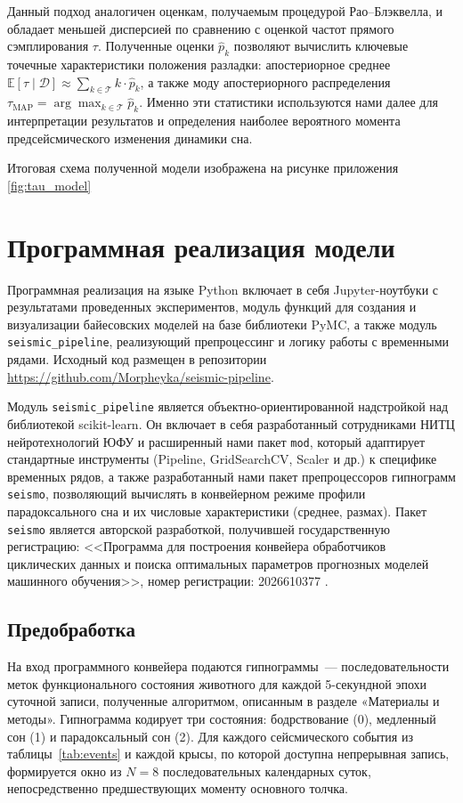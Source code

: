 \documentclass[14pt]{mmcs_article}
\begin{document}
Данный подход аналогичен оценкам, получаемым процедурой
Рао--Блэквелла, и обладает меньшей дисперсией по сравнению с
оценкой частот прямого сэмплирования $\tau$. Полученные оценки
$\hat{p}_k$ позволяют вычислить ключевые точечные
характеристики положения разладки: апостериорное среднее
$\mathbb{E}[\tau \mid \mathcal{D}]
\approx \sum_{k \in \mathcal{T}} k \cdot \hat{p}_k$, а также
моду апостериорного распределения
$\tau_{\mathrm{MAP}} = \arg\max_{k \in \mathcal{T}} \hat{p}_k$.
Именно эти статистики используются нами далее для интерпретации
результатов и определения наиболее вероятного момента
предсейсмического изменения динамики сна.

Итоговая схема полученной модели изображена на рисунке приложения \ref{fig:tau_model}

\section{Программная реализация модели}\label{progmod}

Программная реализация на языке Python включает в себя
Jupyter-ноутбуки с результатами проведенных экспериментов,
модуль функций для создания и визуализации байесовских
моделей на базе библиотеки PyMC, а также модуль
\texttt{seismic\_pipeline}, реализующий препроцессинг и
логику работы с временными рядами. Исходный код размещен в
репозитории
\url{https://github.com/Morpheyka/seismic-pipeline}.

Модуль \texttt{seismic\_pipeline} является
объектно-ориентированной надстройкой над библиотекой
scikit-learn. Он включает в себя разработанный сотрудниками
НИТЦ нейротехнологий ЮФУ и расширенный нами пакет
\texttt{mod}, который адаптирует стандартные инструменты
(Pipeline, GridSearchCV, Scaler и др.) к специфике
временных рядов, а также разработанный нами пакет
препроцессоров гипнограмм \texttt{seismo}, позволяющий
вычислять в конвейерном режиме профили парадоксального сна и
их числовые характеристики (среднее, размах). Пакет
\texttt{seismo} является авторской
разработкой, получившей государственную регистрацию:
<<Программа для построения конвейера обработчиков циклических
данных и поиска оптимальных параметров прогнозных моделей
машинного обучения>>, номер регистрации: 2026610377 \cite{patent}.

\subsection{Предобработка}

На вход программного конвейера подаются гипнограммы~---
последовательности меток функционального состояния животного
для каждой 5-секундной эпохи суточной записи, полученные
алгоритмом, описанным в разделе «Материалы и методы».
Гипнограмма кодирует три состояния: бодрствование (0),
медленный сон (1) и парадоксальный сон (2). Для каждого
сейсмического события из таблицы~\ref{tab:events} и каждой
крысы, по которой доступна непрерывная запись, формируется
окно из $N=8$ последовательных календарных суток,
непосредственно предшествующих моменту основного толчка.
\end{document}
